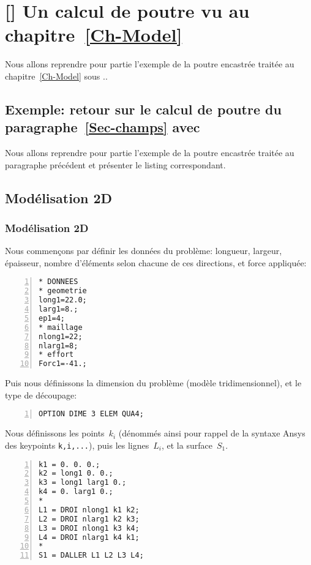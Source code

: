 \ifVersionAvecExemplesSepares
  \chapter{[\castem] Un calcul de poutre vu au chapitre~\ref{Ch-Model}}

  Nous allons reprendre pour partie l'exemple de la poutre encastrée traitée au chapitre~\ref{Ch-Model} sous \castem..
\else
  \section{Exemple: retour sur le calcul de poutre du paragraphe~\ref{Sec-champs} avec \castem}

  Nous allons reprendre pour partie l'exemple de la poutre encastrée traitée au paragraphe précédent et présenter
  le listing \castem correspondant.
\fi



\medskip
\ifVersionAvecExemplesSepares
  \section{Modélisation 2D}
\else
  \subsection{Modélisation 2D}
\fi

Nous commençons par définir les données du problème: longueur, largeur, épaisseur, nombre d'éléments
selon chacune de ces directions, et force appliquée:

\begin{Verbatim}[numbers=left,numbersep=3pt]
* DONNEES
* geometrie
long1=22.0;
larg1=8.;
ep1=4;
* maillage
nlong1=22;
nlarg1=8;
* effort
Forc1=-41.;
\end{Verbatim}

\medskip
Puis nous définissons la dimension du problème (modèle tridimensionnel), et le type de découpage:

\begin{Verbatim}[numbers=left,numbersep=3pt,firstnumber=last]
OPTION DIME 3 ELEM QUA4;
\end{Verbatim}

\medskip
Nous définissons les points~$k_i$ (dénommés ainsi pour rappel de la syntaxe Ansys des keypoints \verb|k,i,...|), puis les
lignes~$L_i$, et la surface~$S_1$.

\begin{Verbatim}[numbers=left,numbersep=3pt,firstnumber=last]
k1 = 0. 0. 0.;
k2 = long1 0. 0.;
k3 = long1 larg1 0.;
k4 = 0. larg1 0.;
*
L1 = DROI nlong1 k1 k2;
L2 = DROI nlarg1 k2 k3;
L3 = DROI nlong1 k3 k4;
L4 = DROI nlarg1 k4 k1;
*
S1 = DALLER L1 L2 L3 L4;
\end{Verbatim}

